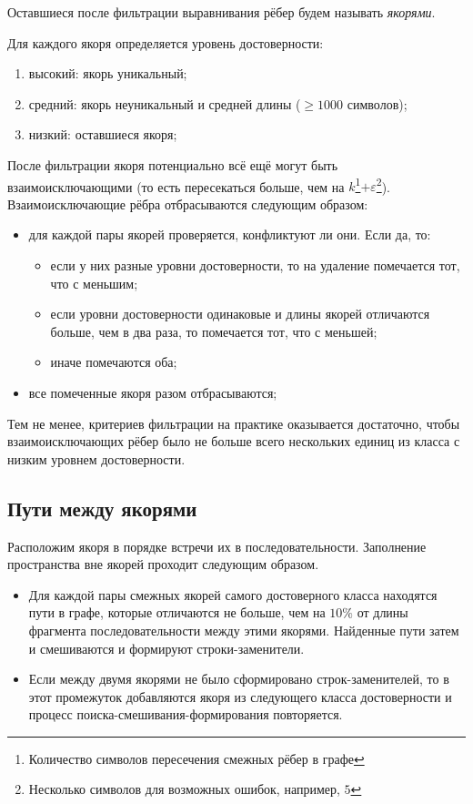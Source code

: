 \documentclass[14pt]{matmex-diploma-custom}
\begin{document}
Оставшиеся после фильтрации выравнивания рёбер будем называть \textit{якорями}. 

Для каждого якоря определяется уровень достоверности:
\begin{enumerate}
    \item высокий: якорь уникальный;
    \item средний: якорь неуникальный и средней длины ($\ge 1000$ символов);
    \item низкий: оставшиеся якоря;
\end{enumerate}

После фильтрации якоря потенциально всё ещё могут быть взаимоисключающими (то есть пересекаться больше, чем на $k$\footnote{Количество символов пересечения смежных рёбер в графе}$+\varepsilon$\footnote{Несколько символов для возможных ошибок, например, $5$}). Взаимоисключающие рёбра отбрасываются следующим образом:
\begin{itemize}
    \item для каждой пары якорей проверяется, конфликтуют ли они. Если да, то:
    \begin{itemize}
        \item если у них разные уровни достоверности, то на удаление помечается тот, что с меньшим;
        \item если уровни достоверности одинаковые и длины якорей отличаются больше, чем в два раза, то помечается тот, что с меньшей;
        \item иначе помечаются оба;
    \end{itemize}
    \item все помеченные якоря разом отбрасываются;
\end{itemize}

Тем не менее, критериев фильтрации на практике оказывается достаточно, чтобы взаимоисключающих рёбер было не больше всего нескольких единиц из класса с низким уровнем достоверности.

\subsection{Пути между якорями}
Расположим якоря в порядке встречи их в последовательности. Заполнение пространства вне якорей проходит следующим образом.
\begin{itemize}
    \item Для каждой пары смежных якорей самого достоверного класса находятся пути в графе, которые отличаются не больше, чем на $10\%$ от длины фрагмента последовательности между этими якорями. Найденные пути затем и смешиваются и формируют строки-заменители.
    \item Если между двумя якорями не было сформировано строк-заменителей, то в этот промежуток добавляются якоря из следующего класса достоверности и процесс поиска-смешивания-формирования повторяется.
\end{itemize}
\end{document}
